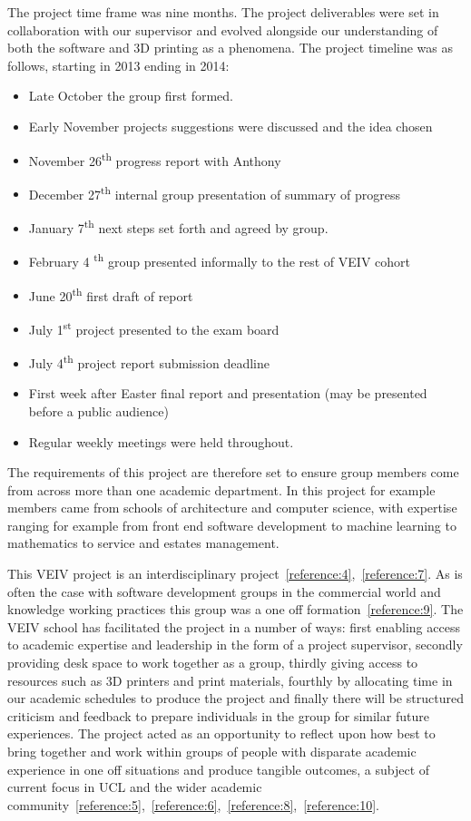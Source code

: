 \documentclass[11pt]{report} %
\begin{document}
The project time frame was nine months. The project deliverables were set in collaboration with our supervisor and evolved alongside our understanding of both the software and 3D printing as a phenomena. The project timeline was as follows, starting in 2013 ending in 2014:

\begin{itemize}
\item Late October the group first formed. 
\item Early November projects suggestions were discussed and the idea chosen 
\item November 26\textsuperscript{th} progress report with Anthony 
\item December 27\textsuperscript{th} internal group presentation of summary of progress 
\item January 7\textsuperscript{th} next steps set forth and agreed by group.
\item February 4 \textsuperscript{th} group presented informally to the rest of VEIV cohort 
\item June 20\textsuperscript{th} first draft of report 
\item July 1\textsuperscript{st} project presented to the exam board
\item July 4\textsuperscript{th} project report submission deadline 
\item First week after Easter final report and presentation (may be presented before a public audience)
\item Regular weekly meetings were held throughout. 
\end{itemize}

The requirements of this project are therefore set to ensure group members come from across more than one academic department. In this project for example members came from schools of architecture and computer science, with expertise ranging for example from front end software development to machine learning to mathematics to service and estates management. 

This VEIV project is an interdisciplinary project~\ref{reference:4},~\ref{reference:7}. As is often the case with software development groups in the commercial world and knowledge working practices this group was a one off formation~\ref{reference:9}. The VEIV school has facilitated the project in a number of ways: first enabling access to academic expertise and leadership in the form of a project supervisor, secondly providing desk space to work together as a group, thirdly giving access to resources such as 3D printers and print materials, fourthly by allocating time in our academic schedules to produce the project and finally there will be structured criticism and feedback to prepare individuals in the group for similar future experiences. The project acted as an opportunity to reflect upon how best to bring together and work within groups of people with disparate academic experience in one off situations and produce tangible outcomes, a subject of current focus in UCL and the wider academic community~\ref{reference:5},~\ref{reference:6},~\ref{reference:8},~\ref{reference:10}. 
\end{document}
